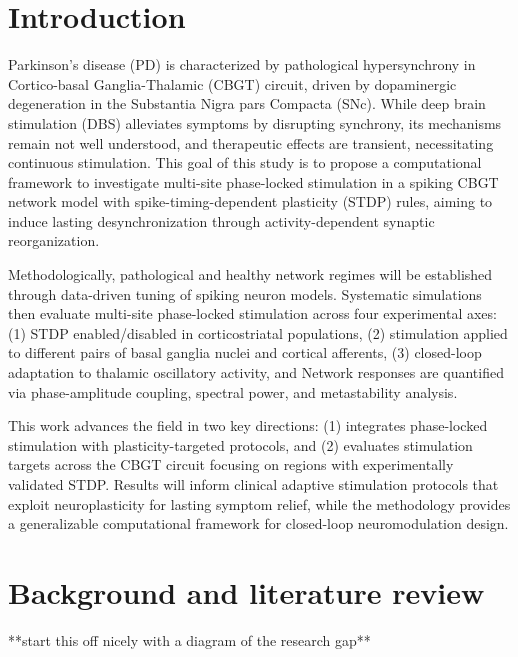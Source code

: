 \tableofcontents
\newpage

\section{Introduction}
Parkinson's disease (PD) is characterized by pathological hypersynchrony in Cortico-basal Ganglia-Thalamic
(CBGT) circuit, driven by dopaminergic degeneration in the Substantia Nigra pars Compacta (SNc). While deep
brain stimulation (DBS) alleviates symptoms by disrupting synchrony, its mechanisms remain not well understood,
and therapeutic effects are transient, necessitating continuous stimulation. This goal of this study is to propose
a computational framework to investigate multi-site phase-locked stimulation in a spiking CBGT network model with
spike-timing-dependent plasticity (STDP) rules, aiming to induce lasting desynchronization through activity-dependent
synaptic reorganization.

Methodologically, pathological and healthy network regimes will be established through data-driven tuning of spiking neuron models.
Systematic simulations then evaluate multi-site phase-locked stimulation across four experimental axes:
(1) STDP enabled/disabled in corticostriatal populations,
(2) stimulation applied to different pairs of basal ganglia nuclei and cortical afferents,
(3) closed-loop adaptation to thalamic oscillatory activity, and
Network responses are quantified via phase-amplitude coupling, spectral power, and metastability analysis.

This work advances the field in two key directions:
(1) integrates phase-locked stimulation with plasticity-targeted protocols, and
(2) evaluates stimulation targets across the CBGT circuit focusing on regions with experimentally validated STDP.
Results will inform clinical adaptive stimulation protocols that exploit neuroplasticity for lasting symptom relief,
while the methodology provides a generalizable computational framework for closed-loop neuromodulation design.

\section{Background and literature review}
**start this off nicely with a diagram of the research gap**

